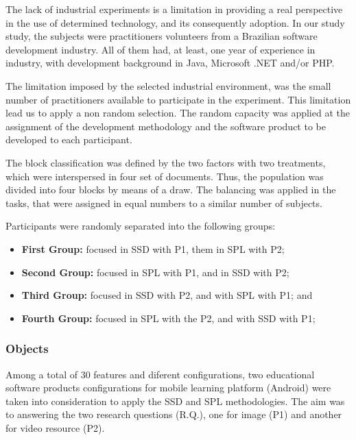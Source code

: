 The lack of industrial experiments is a limitation in providing a real perspective in the use of determined technology, and its consequently adoption. In our study study, the subjects were practitioners volunteers from a Brazilian software development industry. All of them had, at least, one year of experience in industry, with development background in Java, Microsoft .NET and/or PHP.

The limitation imposed by the selected industrial environment, was the small number of practitioners available to participate in the experiment. This limitation lead us to apply a non random selection. The random capacity was applied at the assignment of the development methodology and the software product to be developed to each participant. 

The block classification was defined by the two factors with two treatments, which were interspersed in four set of documents. Thus, the population was divided into four blocks by means of a draw. The balancing was applied in the tasks, that were assigned in equal numbers to a similar number of subjects.

Participants were randomly separated into the following groups:

\begin{itemize}
\item \textbf{First Group:} focused in SSD with P1, them in SPL with P2;

\item \textbf{Second Group:} focused in SPL with P1, and in SSD with P2;

\item \textbf{Third Group:} focused in SSD with P2, and with SPL with P1; and

\item \textbf{Fourth Group:} focused in SPL with the P2, and with SSD with P1;
\end{itemize}


\subsubsection{Objects}

Among a total of 30 features and diferent configurations, two educational software products configurations for mobile learning platform (Android) were taken into consideration to apply the SSD and SPL methodologies. The aim was to answering the two research questions (R.Q.), one for image (P1) and another for video resource (P2).

